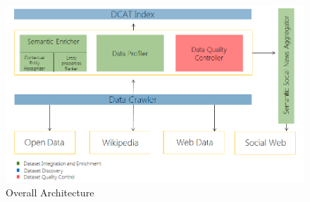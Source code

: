 \documentclass[onecolumn, crcready]{../../Util/LaTEX/iosart2c}
\begin{document}
\begin{figure}[ht!]
  \centering
    \includegraphics[scale=0.5]{architecture_diagram.png}
  \caption{Overall Architecture}
  \label{fig:architecture_diagram}
\end{figure}
\end{document}

